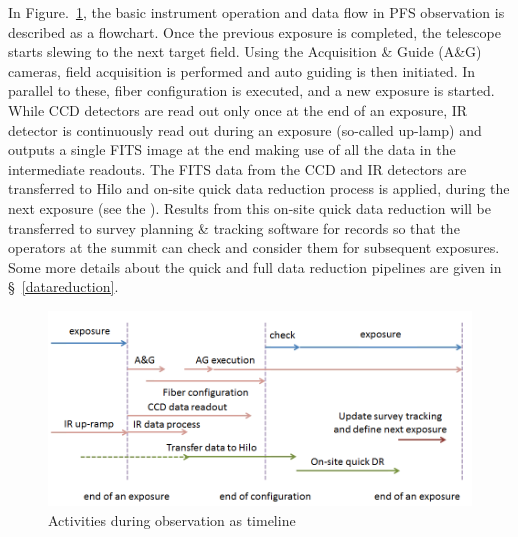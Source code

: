 \documentclass[a4paper,notitlepage]{article}
\begin{document}
In Figure.~\ref{fig:sciops-scireq-slide-oneexp}, the basic instrument
operation and data flow in PFS observation is described as a
flowchart. Once the previous exposure is completed, the telescope starts
slewing to the next target field. Using the Acquisition \& Guide (A\&G)
cameras, field acquisition is performed and auto guiding is then
initiated. In parallel to these, fiber configuration is executed, and a
new exposure is started. While CCD detectors are read out only once at
the end of an exposure, IR detector is continuously read out during an
exposure (so-called up-lamp) and outputs a single FITS image at the end
making use of all the data in the intermediate readouts. The FITS data
from the CCD and IR detectors are transferred to Hilo and on-site quick
data reduction process is applied, during the next exposure (see the
). Results from this on-site quick data reduction will be transferred to
survey planning \& tracking software for records so that the operators
at the summit can check and consider them for subsequent exposures. Some
more details about the quick and full data reduction pipelines are given
in \S~\ref{datareduction}.


\begin{figure}[htb]
  \begin{center}
    \includegraphics[width=.75\linewidth]{sciops-scireq-slide-oneexp.png}
  \end{center}
  \caption{Activities during observation as timeline}
  \label{fig:sciops-scireq-slide-oneexp}
\end{figure}
\end{document}
